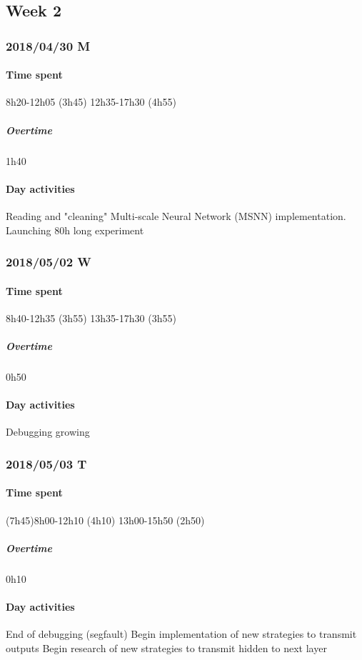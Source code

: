 \subsection{Week 2}
\subsubsection{2018/04/30 M}
\paragraph{Time spent}
{8h20}-{12h05} (3h45)
{12h35}-{17h30} (4h55)

\subparagraph{Overtime}
1h40

\paragraph{Day activities}
Reading and "cleaning" Multi-scale Neural Network (MSNN) implementation.
Launching 80h long experiment

\subsubsection{2018/05/02 W}
\paragraph{Time spent}
{8h40}-{12h35} (3h55)
{13h35}-{17h30} (3h55) 

\subparagraph{Overtime}
0h50

\paragraph{Day activities}
Debugging growing

\subsubsection{2018/05/03 T}
\paragraph{Time spent}
{(7h45)8h00}-{12h10} (4h10)
{13h00}-{15h50} (2h50) 

\subparagraph{Overtime}
0h10

\paragraph{Day activities}
End of debugging (segfault)
Begin implementation of new strategies to transmit outputs
Begin research of new strategies to transmit hidden to next layer

